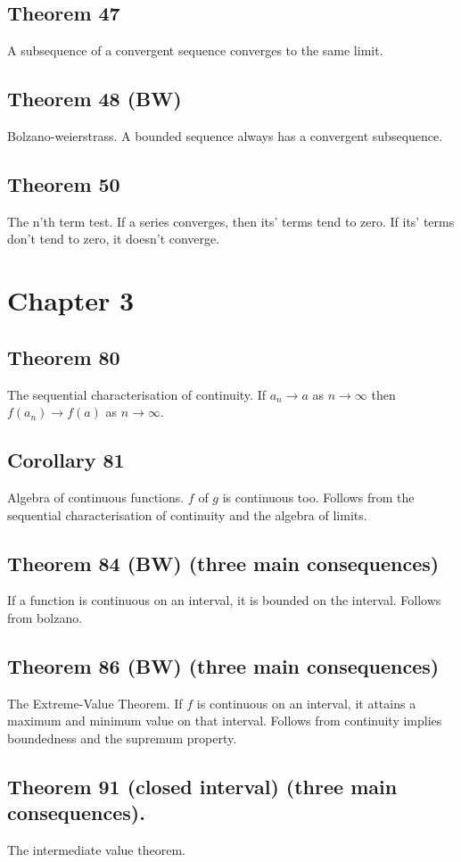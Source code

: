 \documentclass{article}
\begin{document}
\subsection{Theorem 47}
A subsequence of a convergent sequence converges to the same limit.
\subsection{Theorem 48 (BW)}
Bolzano-weierstrass. A bounded sequence always has a convergent subsequence.
\subsection{Theorem 50}
The n'th term test. If a series converges, then its' terms tend to zero.
If its' terms don't tend to zero, it doesn't converge.
\newpage{}
\section*{Chapter 3}
\subsection{Theorem 80}
The sequential characterisation of continuity. If $a_n \to a$
as $n \to \infty$ then $f(a_n) \to f(a)$ as $n \to \infty$.
\subsection{Corollary 81}
Algebra of continuous functions. $f$ of $g$ is continuous too. Follows from the sequential
characterisation of continuity and the algebra of limits.
\subsection{Theorem 84 (BW) (three main consequences)}
If a function is continuous on an interval, it is bounded on the interval. Follows
from bolzano.
\subsection{Theorem 86 (BW) (three main consequences)}
The Extreme-Value Theorem. If $f$ is continuous on an interval,
it attains a maximum and minimum value on that interval. Follows from
continuity implies boundedness and the supremum property.
\subsection{Theorem 91 (closed interval) (three main consequences).}
The intermediate value theorem.
\end{document}
